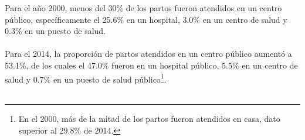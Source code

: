 Para el año 2000, menos del 30\% de los partos fueron atendidos en un centro público, específicamente el  25.6\% en un hospital, 3.0\% en un centro de salud y 0.3\% en un puesto de salud. \\\\
 Para el 2014, la proporción de partos atendidos en un centro público aumentó a 53.1\%, de los cuales el 47.0\% fueron en un hospital público, 5.5\% en un centro de salud y 0.7\% en un puesto de salud público\footnote{En el 2000, más de la mitad de los partos fueron atendidos en casa, dato superior al  29.8\% de 2014. }.\\\\
 